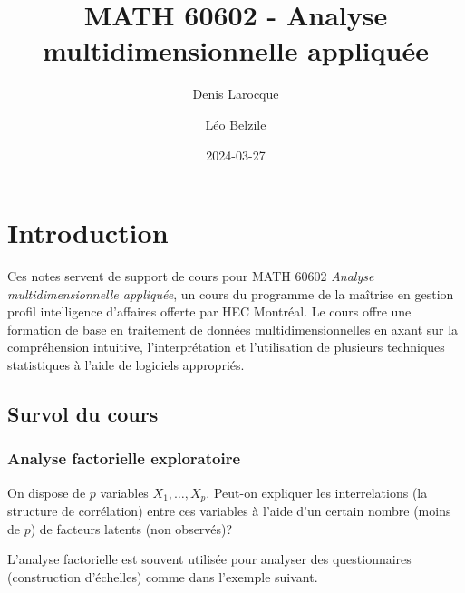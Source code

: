 \documentclass[
  11pt,
  letterpaper,
]{scrbook}
\title{MATH 60602 - Analyse multidimensionnelle appliquée}
\author{Denis Larocque \and Léo Belzile}
\date{2024-03-27}
\renewcommand*\contentsname{Table des matières}
\newcommand\contentsname{Table des matières}
\theoremstyle{definition}
\theoremstyle{remark}
\begin{document}


\ifdefined\Shaded\renewenvironment{Shaded}{\begin{tcolorbox}[breakable, borderline west={3pt}{0pt}{shadecolor}, boxrule=0pt, interior hidden, enhanced, sharp corners, frame hidden]}{\end{tcolorbox}}\fi

\renewcommand*\contentsname{Table des matières}
{
\setcounter{tocdepth}{2}
\tableofcontents
}
\mainmatter
{}

\hypertarget{introduction}{%
\chapter{Introduction}\label{introduction}}

Ces notes servent de support de cours pour MATH 60602 \emph{Analyse
multidimensionnelle appliquée}, un cours du programme de la maîtrise en
gestion profil intelligence d'affaires offerte par HEC Montréal. Le
cours offre une formation de base en traitement de données
multidimensionnelles en axant sur la compréhension intuitive,
l'interprétation et l'utilisation de plusieurs techniques statistiques à
l'aide de logiciels appropriés.

\hypertarget{survol-du-cours}{%
\section{Survol du cours}\label{survol-du-cours}}

\hypertarget{analyse-factorielle-exploratoire}{%
\subsection{Analyse factorielle
exploratoire}\label{analyse-factorielle-exploratoire}}

On dispose de \(p\) variables \(X_1, \ldots, X_p\). Peut-on expliquer
les interrelations (la structure de corrélation) entre ces variables à
l'aide d'un certain nombre (moins de \(p\)) de facteurs latents (non
observés)?

L'analyse factorielle est souvent utilisée pour analyser des
questionnaires (construction d'échelles) comme dans l'exemple suivant.
\end{document}
